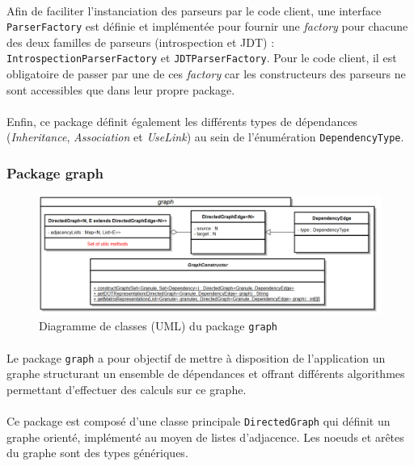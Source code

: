\documentclass{scrartcl}
\begin{document}
	\paragraph{}Afin de faciliter l'instanciation des parseurs par le code client, une interface \texttt{ParserFactory} est définie et implémentée pour fournir une \emph{factory} pour chacune des deux familles de parseurs (introspection et JDT) : \texttt{IntrospectionParserFactory} et \texttt{JDTParserFactory}. Pour le code client, il est obligatoire de passer par une de ces \emph{factory} car les constructeurs des parseurs ne sont accessibles que dans leur propre package.
	
	\paragraph{}Enfin, ce package définit également les différents types de dépendances (\emph{Inheritance}, \emph{Association} et \emph{UseLink}) au sein de l'énumération \texttt{DependencyType}.
    
\subsubsection{Package graph}

    \begin{figure}[H]
        \centering
        \includegraphics[width=\textwidth]{img/uml/graph.png}
        \caption{Diagramme de classes (UML) du package \texttt{graph}}
    \end{figure}

    \paragraph{}Le package \texttt{graph} a pour objectif de mettre à disposition de l’application un graphe structurant un ensemble de dépendances et offrant différents algorithmes permettant d’effectuer des calculs sur ce graphe. 
    
    \paragraph{}Ce package est composé d’une classe principale \texttt{DirectedGraph} qui définit un graphe orienté, implémenté au moyen de listes d'adjacence. Les noeuds et arêtes du graphe sont des types génériques.
    
\end{document}
